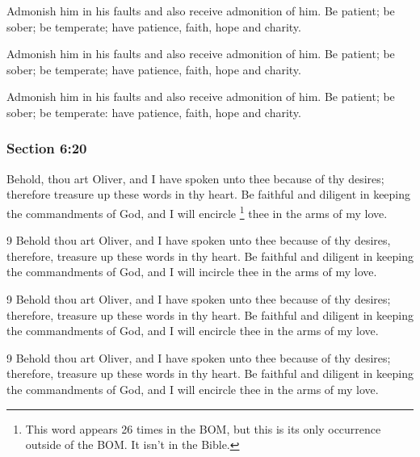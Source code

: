 		\begin{framed}
		\scriptsize
			\begin{compactdesc}
				\item[JSP] Admonish him in his faults and also receive admonition of him. Be patient; be sober; be temperate; have patience, faith, hope and charity.
				\item[DC 1835] Admonish him in his faults and also receive admonition of him. Be patient; be sober; be temperate; have patience, faith, hope and charity.
				\item[DC 1844] Admonish him in his faults and also receive admonition of him. Be patient; be sober; be temperate: have patience, faith, hope and charity.
			\end{compactdesc}
		\end{framed}

	\subsubsection{Section 6:20} %
		\label{DC6-20}

		Behold, thou art Oliver, and I have spoken unto thee because of thy desires; therefore treasure up these words in thy heart. Be faithful and diligent in keeping the commandments of God, and I will encircle%
			\footnote{%
				This word appears 26 times in the BOM, but this is its only occurrence outside of the BOM. It isn't in the Bible.
				}
		thee in the arms of my love.

		\begin{framed}
		\scriptsize
			\begin{compactdesc}
				\item[JSP] 9 Behold thou art Oliver, and I have spoken unto thee because of thy desires, therefore, treasure up these words in thy heart. Be faithful and diligent in keeping the commandments of God, and I will incircle thee in the arms of my love.
				\item[DC 1835] 9 Behold thou art Oliver, and I have spoken unto thee because of thy desires; therefore, treasure up these words in thy heart. Be faithful and diligent in keeping the commandments of God, and I will encircle thee in the arms of my love.
				\item[DC 1844] 9 Behold thou art Oliver, and I have spoken unto thee because of thy desires; therefore, treasure up these words in thy heart. Be faithful and diligent in keeping the commandments of God, and I will encircle thee in the arms of my love.
			\end{compactdesc}
		\end{framed}

